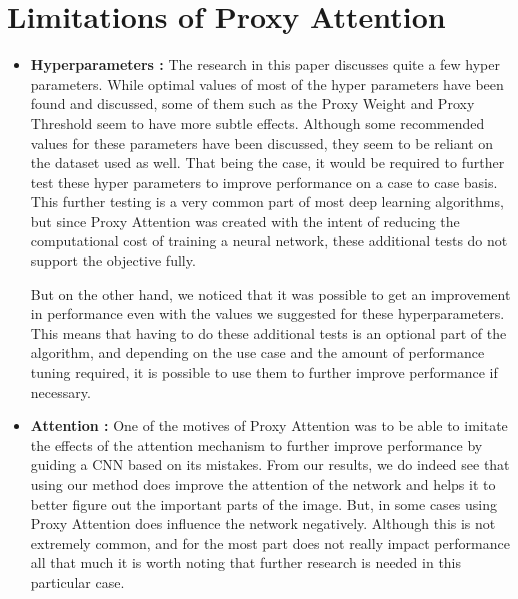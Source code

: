 \documentclass[a4paper,11pt,openright]{book}
\begin{document}
\section{Limitations of Proxy Attention}
\begin{itemize}
\item \textbf{Hyperparameters :} The research in this paper discusses quite a few hyper parameters. While optimal values of most of the hyper parameters have been found and discussed, some of them such as the Proxy Weight and Proxy Threshold seem to have more subtle effects. Although some recommended values for these parameters have been discussed, they seem to be reliant on the dataset used as well. That being the case, it would be required to further test these hyper parameters to improve performance on a case to case basis. This further testing is a very common part of most deep learning algorithms, but since Proxy Attention was created with the intent of reducing the computational cost of training a neural network, these additional tests do not support the objective fully. 

But on the other hand, we noticed that it was possible to get an improvement in performance even with the values we suggested for these hyperparameters. This means that having to do these additional tests is an optional part of the algorithm, and depending on the use case and the amount of performance tuning required, it is possible to use them to further improve performance if necessary.
\item \textbf{Attention :} One of the motives of Proxy Attention was to be able to imitate the effects of the attention mechanism to further improve performance by guiding a CNN based on its mistakes. From our results, we do indeed see that using our method does improve the attention of the network and helps it to better figure out the important parts of the image. But, in some cases using Proxy Attention does influence the network negatively. Although this is not extremely common, and for the most part does not really impact performance all that much it is worth noting that further research is needed in this particular case. 


\end{itemize}
\end{document}
